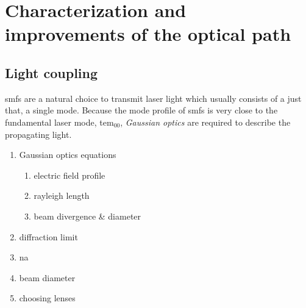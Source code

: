 \chapter{Characterization and improvements of the optical path}\label{ch:setup:optics}

\section{Light coupling}\label{sec:setup:optics:coupling}
\Glspl{smf} are a natural choice to transmit laser light which usually consists of a just that, a single mode.
Because the mode profile of \glspl{smf} is very close to the fundamental laser mode, \acrshort{tem}$_{00}$, \emph{Gaussian optics} are required to describe the propagating light.

\begin{enumerate}
    \item Gaussian optics equations \begin{enumerate}
        \item electric field profile
        \item rayleigh length
        \item beam divergence \& diameter
    \end{enumerate}
    \item diffraction limit
    \item \gls{na}
    \item beam diameter
    \item choosing lenses
\end{enumerate}

